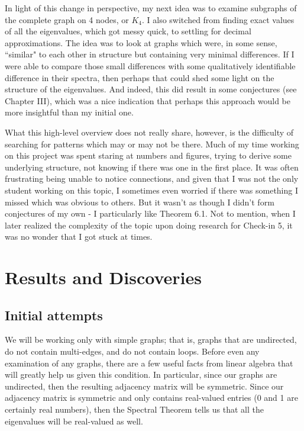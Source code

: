 \documentclass{article}
\begin{document}
In light of this change in perspective, my next idea was to examine subgraphs of the complete graph on 4 nodes, or $ K_{4} $.
I also switched from finding exact values of all the eigenvalues, which got messy quick, to settling for decimal approximations.
The idea was to look at graphs which were, in some sense, ``similar" to each other in structure but containing very minimal differences.
If I were able to compare those small differences with some qualitatively identifiable difference in their spectra, then perhaps that could shed some light on the structure of the eigenvalues.
And indeed, this did result in some conjectures (see Chapter III), which was a nice indication that perhaps this approach would be more insightful than my initial one.

What this high-level overview does not really share, however, is the difficulty of searching for patterns which may or may not be there.
Much of my time working on this project was spent staring at numbers and figures, trying to derive some underlying structure, not knowing if there was one in the first place.
It was often frustrating being unable to notice connections, and given that I was not the only student working on this topic, I sometimes even worried if there was something I missed which was obvious to others.
But it wasn't as though I didn't form conjectures of my own - I particularly like Theorem 6.1.
Not to mention, when I later realized the complexity of the topic upon doing research for Check-in 5, it was no wonder that I got stuck at times.

\newpage
\section{Results and Discoveries}
\subsection{Initial attempts}

We will be working only with simple graphs; that is, graphs that are undirected, do not contain multi-edges, and do not contain loops.
Before even any examination of any graphs, there are a few useful facts from linear algebra that will greatly help us given this condition.
In particular, since our graphs are undirected, then the resulting adjacency matrix will be symmetric.
Since our adjacency matrix is symmetric and only contains real-valued entries (0 and 1 are certainly real numbers), then the Spectral Theorem tells us that all the eigenvalues will be real-valued as well.
\end{document}

